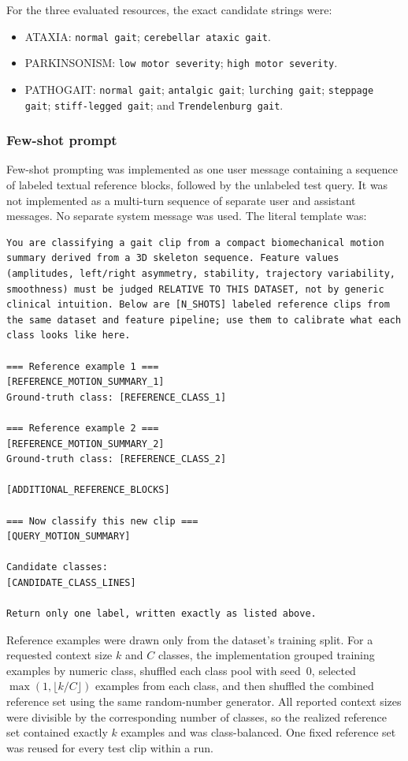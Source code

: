For the three evaluated resources, the exact candidate strings were:
\begin{itemize}
    \item ATAXIA: \texttt{normal gait};
    \texttt{cerebellar ataxic gait}.
    \item PARKINSONISM: \texttt{low motor severity};
    \texttt{high motor severity}.
    \item PATHOGAIT: \texttt{normal gait};
    \texttt{antalgic gait}; \texttt{lurching gait};
    \texttt{steppage gait}; \texttt{stiff-legged gait};
    and \texttt{Trendelenburg gait}.
\end{itemize}




\subsubsection{Few-shot prompt}

Few-shot prompting was implemented as one user message containing a
sequence of labeled textual reference blocks, followed by the
unlabeled test query. It was not implemented as a multi-turn sequence
of separate user and assistant messages. No separate system message
was used. The literal template was:

\begin{Verbatim}[fontsize=\scriptsize,frame=single,breaklines=true]
You are classifying a gait clip from a compact biomechanical motion summary derived from a 3D skeleton sequence. Feature values (amplitudes, left/right asymmetry, stability, trajectory variability, smoothness) must be judged RELATIVE TO THIS DATASET, not by generic clinical intuition. Below are [N_SHOTS] labeled reference clips from the same dataset and feature pipeline; use them to calibrate what each class looks like here.

=== Reference example 1 ===
[REFERENCE_MOTION_SUMMARY_1]
Ground-truth class: [REFERENCE_CLASS_1]

=== Reference example 2 ===
[REFERENCE_MOTION_SUMMARY_2]
Ground-truth class: [REFERENCE_CLASS_2]

[ADDITIONAL_REFERENCE_BLOCKS]

=== Now classify this new clip ===
[QUERY_MOTION_SUMMARY]

Candidate classes:
[CANDIDATE_CLASS_LINES]

Return only one label, written exactly as listed above.
\end{Verbatim}

Reference examples were drawn only from the dataset's training split.
For a requested context size $k$ and $C$ classes, the implementation
grouped training examples by numeric class, shuffled each class pool
with seed~0, selected
$\max(1,\lfloor k/C\rfloor)$ examples from each class, and then
shuffled the combined reference set using the same random-number
generator. All reported context sizes were divisible by the
corresponding number of classes, so the realized reference set
contained exactly $k$ examples and was class-balanced. One fixed
reference set was reused for every test clip within a run.

